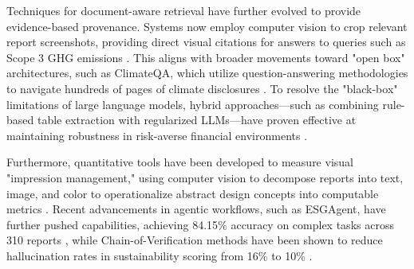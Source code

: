 \documentclass{article}
\begin{document}
Techniques for document-aware retrieval have further evolved to provide evidence-based provenance. Systems now employ computer vision to crop relevant report screenshots, providing direct visual citations for answers to queries such as Scope 3 GHG emissions  \parencite{pulkit_parikh_19ae49ff}. This aligns with broader movements toward "open box" architectures, such as ClimateQA, which utilize question-answering methodologies to navigate hundreds of pages of climate disclosures  \parencite{alexandra_sasha_luccioni_f5a602b0}. To resolve the "black-box" limitations of large language models, hybrid approaches—such as combining rule-based table extraction with regularized LLMs—have proven effective at maintaining robustness in risk-averse financial environments  \parencite{hendrik_weichel_5ea70935}.

Furthermore, quantitative tools have been developed to measure visual "impression management," using computer vision to decompose reports into text, image, and color to operationalize abstract design concepts into computable metrics  \parencite{bingjie_li_487d69fd}. Recent advancements in agentic workflows, such as ESGAgent, have further pushed capabilities, achieving 84.15\% accuracy on complex tasks across 310 reports  \parencite{yilei_zhao_b7bbd9c8}, while Chain-of-Verification methods have been shown to reduce hallucination rates in sustainability scoring from 16\% to 10\%  \parencite{yue_wu_cae353aa}.
\end{document}
